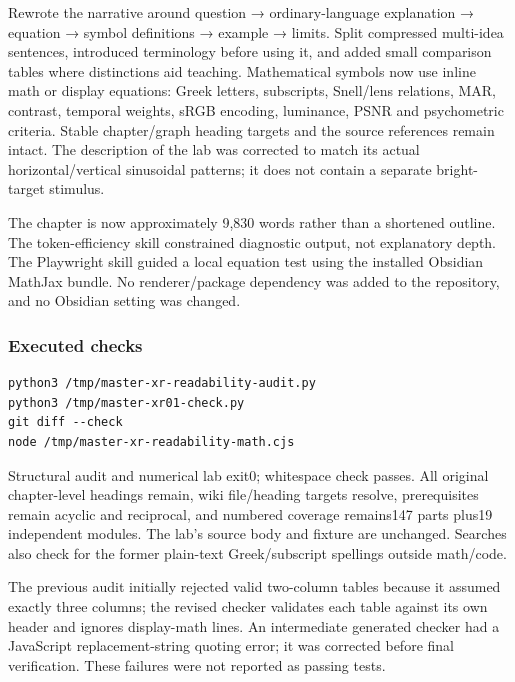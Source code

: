 Rewrote the narrative around question → ordinary-language explanation → equation → symbol definitions → example → limits. Split compressed multi-idea sentences, introduced terminology before using it, and added small comparison tables where distinctions aid teaching. Mathematical symbols now use inline math or display equations: Greek letters, subscripts, Snell/lens relations, MAR, contrast, temporal weights, sRGB encoding, luminance, PSNR and psychometric criteria. Stable chapter/graph heading targets and the source references remain intact. The description of the lab was corrected to match its actual horizontal/vertical sinusoidal patterns; it does not contain a separate bright-target stimulus.

The chapter is now approximately 9,830 words rather than a shortened outline. The token-efficiency skill constrained diagnostic output, not explanatory depth. The Playwright skill guided a local equation test using the installed Obsidian MathJax bundle. No renderer/package dependency was added to the repository, and no Obsidian setting was changed.

\subsubsection{Executed checks}\label{appendix-a103e7846d21-executed-checks}

\hypertarget{appendix-a103e7846d21-executed-checks}{}

\begin{verbatim}
python3 /tmp/master-xr-readability-audit.py
python3 /tmp/master-xr01-check.py
git diff --check
node /tmp/master-xr-readability-math.cjs
\end{verbatim}

Structural audit and numerical lab exit0; whitespace check passes. All original chapter-level headings remain, wiki file/heading targets resolve, prerequisites remain acyclic and reciprocal, and numbered coverage remains147 parts plus19 independent modules. The lab's source body and fixture are unchanged. Searches also check for the former plain-text Greek/subscript spellings outside math/code.

The previous audit initially rejected valid two-column tables because it assumed exactly three columns; the revised checker validates each table against its own header and ignores display-math lines. An intermediate generated checker had a JavaScript replacement-string quoting error; it was corrected before final verification. These failures were not reported as passing tests.

